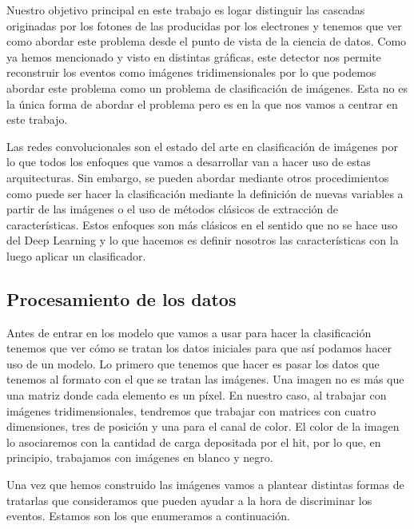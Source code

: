 \documentclass[a4paper,12pt,twoside,titlepage]{article}
\begin{document}
Nuestro objetivo principal en este trabajo es logar distinguir las cascadas originadas por los fotones de las producidas por los electrones y tenemos que ver como abordar este problema desde el punto de vista de la ciencia de datos. Como ya hemos mencionado y visto en distintas gráficas, este detector nos permite reconstruir los eventos como imágenes tridimensionales por lo que podemos abordar este problema como un problema de clasificación de imágenes. Esta no es la única forma de abordar el problema pero es en la que nos vamos a centrar en este trabajo.

Las redes convolucionales son el estado del arte en clasificación de imágenes por lo que todos los enfoques que vamos a desarrollar van a hacer uso de estas arquitecturas. Sin embargo, se pueden abordar mediante otros procedimientos como puede ser hacer la clasificación mediante la definición de nuevas variables a partir de las imágenes o el uso de métodos clásicos de extracción de características. Estos enfoques son más clásicos en el sentido que no se hace uso del Deep Learning y lo que hacemos es definir nosotros las características con la luego aplicar un clasificador.

\subsection{Procesamiento de los datos}

Antes de entrar en los modelo que vamos a usar para hacer la clasificación tenemos que ver cómo  se tratan los datos iniciales para que así podamos hacer uso de un modelo. Lo primero que tenemos que hacer es pasar los datos que tenemos al formato con el que se tratan las imágenes. Una imagen no es más que una matriz donde cada elemento es un píxel. En nuestro caso, al trabajar con imágenes tridimensionales, tendremos que trabajar con matrices con cuatro dimensiones, tres de posición y una para el canal de color. El color de la imagen lo asociaremos con la cantidad de carga depositada por el hit, por lo que, en principio, trabajamos con imágenes en blanco y negro.

Una vez que hemos construido las imágenes vamos a plantear distintas formas de tratarlas que consideramos que pueden ayudar a la hora de discriminar los eventos. Estamos son los que enumeramos a continuación.
\end{document}
